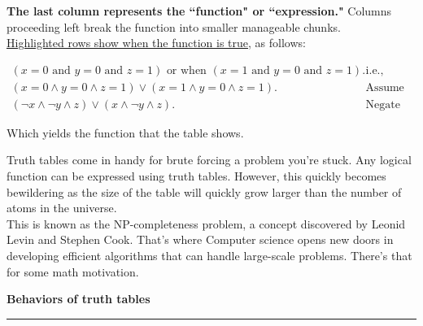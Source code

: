 \vspace{-2em} %
 \textbf{The last column represents the ``function" or ``expression."} Columns proceeding left break the function into smaller manageable chunks.\\
 \underline{Highlighted rows show when the function is true}, as follows:
 
\begin{strat}
\vspace{-1em} %
       \begin{align*}
        (x=0 \text{ and } y=0 \text{ and } z=1) \text{ or when } (x=1 \text{ and } y=0 \text{ and } z=1).& \text{ i.e.,}\\
        (x=0\land y=0\land z=1)\lor(x=1 \land y=0\land z=1).& \text{ Assume inputs to be 1}\\
        (\neg x\land \neg y\land z)\lor(x \land \neg y\land z).& \text{ Negate 0's}
    \end{align*}
\end{strat}
\vspace{-1em} %
Which yields the function that the table shows. 

\begin{note}
    Truth tables come in handy for brute forcing a problem you're stuck. Any logical function can be expressed using truth tables. However, this quickly becomes bewildering as the size of the table will quickly grow larger than the number of atoms in the universe.\\
    
    This is known as the NP-completeness problem, a concept discovered by Leonid Levin and Stephen Cook. That's where Computer science opens new doors in developing efficient algorithms that can handle large-scale problems. There's that for some math motivation.
\end{note}


\newpage

\textbf{Behaviors of truth tables}
\vspace{.3em} %
\hrule %


